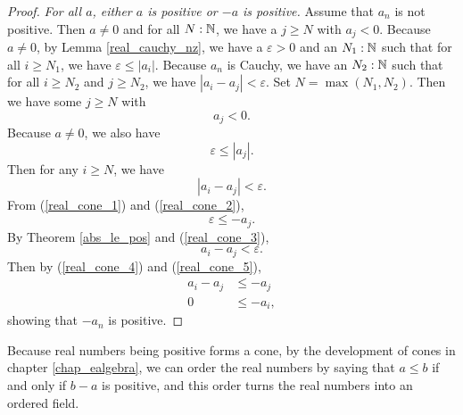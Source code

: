 \documentclass[../../math.tex]{subfiles}
\begin{document}
\begin{proof}
    \textit{For all $a$, either $a$ is positive or $-a$ is positive.}  Assume
    that $a_n$ is not positive.  Then $a \neq 0$ and for all $N : \mathbb{N}$, we have
    a $j \geq N$ with $a_j < 0$.  Because $a \neq 0$, by Lemma
    \ref{real_cauchy_nz}, we have a $\varepsilon > 0$ and an $N_1 : \mathbb{N}$ such
    that for all $i \geq N_1$, we have $\varepsilon \leq |a_i|$.  Because $a_n$
    is Cauchy, we have an $N_2 : \mathbb{N}$ such that for all $i \geq N_2$ and $j \geq
    N_2$, we have $|a_i - a_j| < \varepsilon$.  Set $N = \max(N_1, N_2)$.  Then
    we have some $j \geq N$ with
    \begin{equation} \label{real_cone_1}
        a_j < 0.
    \end{equation}
    Because $a \neq 0$, we also have
    \begin{equation} \label{real_cone_2}
        \varepsilon \leq |a_j|.
    \end{equation}
    Then for any $i \geq N$, we have
    \begin{equation} \label{real_cone_3}
        |a_i - a_j| < \varepsilon.
    \end{equation}
    From (\ref{real_cone_1}) and (\ref{real_cone_2}),
    \begin{equation} \label{real_cone_4}
        \varepsilon \leq -a_j.
    \end{equation}
    By Theorem \ref{abs_le_pos} and (\ref{real_cone_3}),
    \begin{equation} \label{real_cone_5}
        a_i - a_j < \varepsilon.
    \end{equation}
    Then by (\ref{real_cone_4}) and (\ref{real_cone_5}),
    \begin{align*}
        a_i - a_j &\leq -a_j \\
        0 &\leq -a_i,
    \end{align*}
    showing that $-a_n$ is positive.
\end{proof}

Because real numbers being positive forms a cone, by the development of cones in
chapter \ref{chap_ealgebra}, we can order the real numbers by saying that $a
\leq b$ if and only if $b - a$ is positive, and this order turns the real
numbers into an ordered field.
\end{document}
